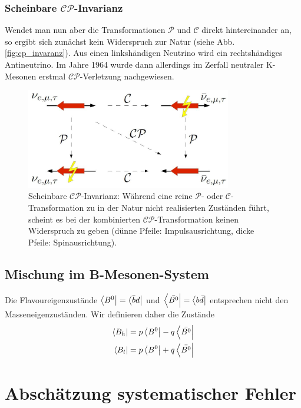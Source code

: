 \documentclass[a4paper]{scrbook}
\begin{document}
\subsection{Scheinbare $\mathcal{CP}$-Invarianz}
Wendet man nun aber die Transformationen $\mathcal{P}$ und $\mathcal{C}$ direkt hintereinander an, so ergibt sich zunächst kein Widerspruch zur Natur (siehe Abb. \ref{fig:cp_invaranz}). Aus einen linkshändigen Neutrino wird ein rechtshändiges Antineutrino. Im Jahre 1964 wurde dann allerdings im Zerfall neutraler K-Mesonen erstmal $\mathcal{CP}$-Verletzung nachgewiesen. \cite{kleinknecht}

\begin{figure}[hptb]
\centering
\includegraphics[width = 0.8\textwidth]{cp_invarianz}
\caption{Scheinbare $\mathcal{CP}$-Invarianz: Während eine reine $\mathcal{P}$- oder $\mathcal{C}$-Transformation zu in der Natur nicht realisierten Zuständen führt, scheint es bei der kombinierten $\mathcal{CP}$-Transformation keinen Widerspruch zu geben (dünne Pfeile: Impulsausrichtung, dicke Pfeile: Spinausrichtung).}
\label{fig:cp_invarianz}
\end{figure}

\section{Mischung im B-Mesonen-System}
Die Flavoureigenzustände $\Bra{B^0} = \Bra{\bar{b}d}$ und $\Bra{\bar{B^0}} = \Bra{b\bar{d}}$ entsprechen nicht den Masseneigenzuständen. Wir definieren daher die Zustände
\begin{align}
\Bra{B_h} = p \Bra{B^0} - q \Bra{\bar{B^0}} \\
\Bra{B_l} = p \Bra{B^0} + q \Bra{\bar{B^0}}
\end{align}

\chapter{Abschätzung systematischer Fehler}
\end{document}
